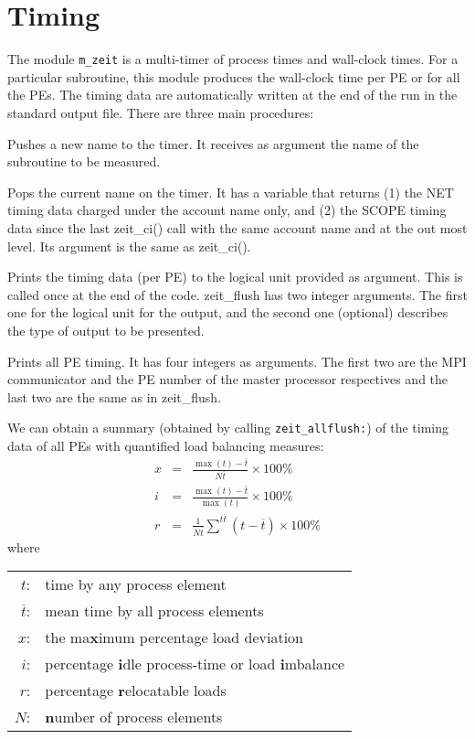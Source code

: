 \section{Timing}
The module {\tt m\_zeit} is a multi-timer of process times and wall-clock 
times. For a particular subroutine, this module produces the wall-clock 
time per PE or for all the PEs. The timing data are automatically written 
at the end of the run in the standard output file.
There are three main procedures:

 Pushes a new name to the timer. 
It receives as argument the name of the subroutine to be measured.

 Pops the current name on the timer. It has a
variable that returns (1) the NET timing data charged under the account 
name only, and (2) the SCOPE timing data since the last zeit\_ci() call with 
the same account name and at the out most level.
Its argument is the same as zeit\_ci().

 Prints the timing data (per PE) to the logical 
unit provided as argument. This is called once at the end of the code.
zeit\_flush has two integer arguments. The first one for the logical 
unit for the output, and the second one (optional) describes the type of
output to be presented.

 Prints all PE timing.
It has four integers as arguments.
The first two are the MPI communicator and the PE number of the master
processor respectives and the last two are the same as in zeit\_flush.

\newcommand{\tb}{\overline{t}}

We can obtain a summary (obtained by calling {\tt zeit\_allflush:}) of the 
timing data of all PEs with quantified load balancing measures:
%
\begin{eqnarray*}
x &=& \frac{\max(t) - \tb}{N\tb}           \times 100\% \\
i &=& \frac{\max(t) - \tb}{\max(t)}        \times 100\% \\
r &=& \frac{1}{N\tb} \sum^{t\tb}{(t-\tb)} \times 100\%
\end{eqnarray*}
%
where
%
\begin{center}
\begin{tabular}{rl}
$t$: & time by any process element			\\
$\tb$: & mean time by all process elements		\\
$x$: & the ma{\bf x}imum percentage load deviation	\\
$i$: & percentage {\bf i}dle process-time or load {\bf i}mbalance \\
$r$: & percentage {\bf r}elocatable loads		\\
$N$: & {\bf n}umber of process elements
\end{tabular}
\end{center}
 
